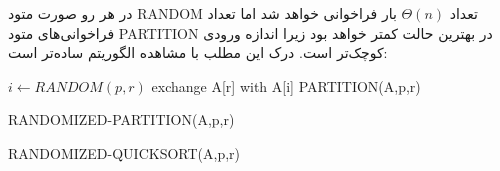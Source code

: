 در هر رو صورت متود RANDOM تعداد $\Theta (n)$ بار فراخوانی خواهد شد اما
تعداد فراخوانی‌های متود PARTITION در بهترین حالت کمتر خواهد بود
زیرا اندازه ورودی کوچک‌تر است. درک این مطلب با مشاهده  الگوریتم
ساده‌تر است:
\begin{LTR}
\begin{algorithm}[H]
\SetAlgoLined
$i \longleftarrow RANDOM(p,r)$\;
exchange A[r] with A[i]\;
\Return PARTITION(A,p,r)\;
\caption{RANDOMIZED-PARTITION(A,p,r)}
\end{algorithm}

\begin{algorithm}[H]
\DontPrintSemicolon
\SetAlgoLined
{}
\caption{RANDOMIZED-QUICKSORT(A,p,r)}
\end{algorithm}
\end{LTR}
